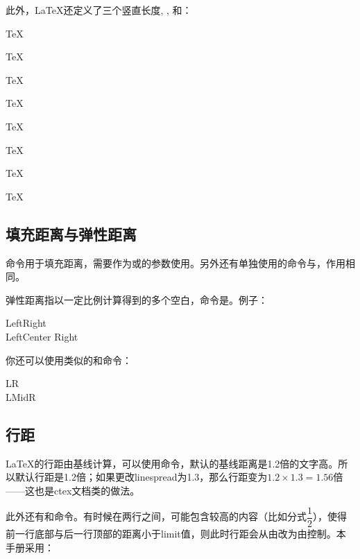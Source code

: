 此外，\LaTeX 还定义了三个竖直长度, , 和：

\begin{codeshow}
\parbox[t]{3em}{TeX\par TeX}
\parbox[t]{3em}{TeX\par\smallskip TeX}
\parbox[t]{3em}{TeX\par\medskip TeX}
\parbox[t]{3em}{TeX\par\bigskip TeX}
\end{codeshow}

\subsection{填充距离与弹性距离}
命令用于填充距离，需要作为或的参数使用。另外还有单独使用的命令与，作用相同。

弹性距离指以一定比例计算得到的多个空白，命令是。例子：

\begin{codeshow}
Left\hspace{\fill}Right\\
LeftCenter
Right
\end{codeshow}

你还可以使用类似的和命令：

\begin{codeshow}
L\hfill R\\
L\hrulefill Mid\dotfill R
\end{codeshow}

\subsection{行距}
\LaTeX 的行距由基线计算，可以使用命令，默认的基线距离是1.2倍的文字高。所以默认行距是1.2倍；如果更改linespread为1.3，那么行距变为$1.2\times 1.3=1.56$倍——这也是ctex文档类的做法。

此外还有和命令。有时候在两行之间，可能包含较高的内容（比如分式$\dfrac{1}{2}$），使得前一行底部与后一行顶部的距离小于limit值，则此时行距会从由改为由控制。本手册采用：
\begin{latex}
\setlength{\lineskiplimit}{3pt}
\setlength{\lineskip}{3pt}
\end{latex}

